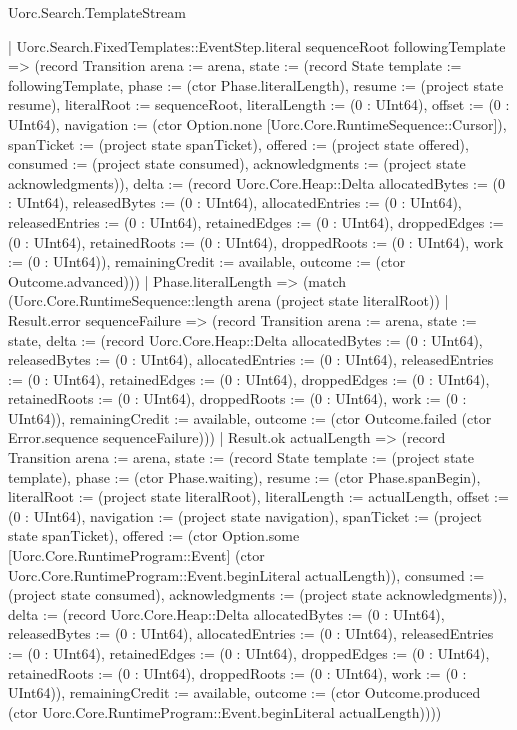 \begin{lexlean}{Uorc.Search.TemplateStream}
\begin{semanticmodule}
{      | Uorc.Search.FixedTemplates::EventStep.literal sequenceRoot followingTemplate => (record Transition {arena := arena, state := (record State {template := followingTemplate, phase := (ctor Phase.literalLength), resume := (project state resume), literalRoot := sequenceRoot, literalLength := (0 : UInt64), offset := (0 : UInt64), navigation := (ctor Option.none [Uorc.Core.RuntimeSequence::Cursor]), spanTicket := (project state spanTicket), offered := (project state offered), consumed := (project state consumed), acknowledgments := (project state acknowledgments)}), delta := (record Uorc.Core.Heap::Delta {allocatedBytes := (0 : UInt64), releasedBytes := (0 : UInt64), allocatedEntries := (0 : UInt64), releasedEntries := (0 : UInt64), retainedEdges := (0 : UInt64), droppedEdges := (0 : UInt64), retainedRoots := (0 : UInt64), droppedRoots := (0 : UInt64), work := (0 : UInt64)}), remainingCredit := available, outcome := (ctor Outcome.advanced)}))
    | Phase.literalLength => (match (Uorc.Core.RuntimeSequence::length arena (project state literalRoot))
      | Result.error sequenceFailure => (record Transition {arena := arena, state := state, delta := (record Uorc.Core.Heap::Delta {allocatedBytes := (0 : UInt64), releasedBytes := (0 : UInt64), allocatedEntries := (0 : UInt64), releasedEntries := (0 : UInt64), retainedEdges := (0 : UInt64), droppedEdges := (0 : UInt64), retainedRoots := (0 : UInt64), droppedRoots := (0 : UInt64), work := (0 : UInt64)}), remainingCredit := available, outcome := (ctor Outcome.failed (ctor Error.sequence sequenceFailure))})
      | Result.ok actualLength => (record Transition {arena := arena, state := (record State {template := (project state template), phase := (ctor Phase.waiting), resume := (ctor Phase.spanBegin), literalRoot := (project state literalRoot), literalLength := actualLength, offset := (0 : UInt64), navigation := (project state navigation), spanTicket := (project state spanTicket), offered := (ctor Option.some [Uorc.Core.RuntimeProgram::Event] (ctor Uorc.Core.RuntimeProgram::Event.beginLiteral actualLength)), consumed := (project state consumed), acknowledgments := (project state acknowledgments)}), delta := (record Uorc.Core.Heap::Delta {allocatedBytes := (0 : UInt64), releasedBytes := (0 : UInt64), allocatedEntries := (0 : UInt64), releasedEntries := (0 : UInt64), retainedEdges := (0 : UInt64), droppedEdges := (0 : UInt64), retainedRoots := (0 : UInt64), droppedRoots := (0 : UInt64), work := (0 : UInt64)}), remainingCredit := available, outcome := (ctor Outcome.produced (ctor Uorc.Core.RuntimeProgram::Event.beginLiteral actualLength))}))
}
\end{semanticmodule}
\end{lexlean}
